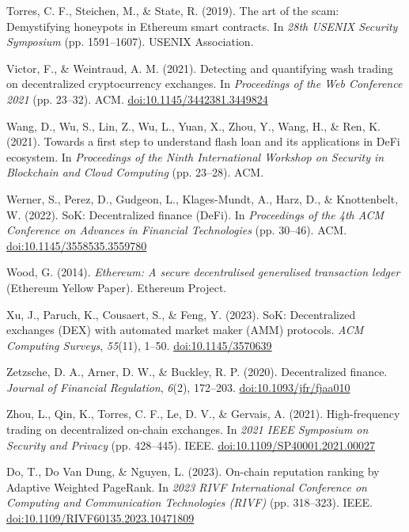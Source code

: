 \begin{enumerate}[label={[\arabic*]}, leftmargin=*, itemsep=0.35em, parsep=0pt]
  \item{}\label{ref:56} Torres, C. F., Steichen, M., \& State, R. (2019). The art of the scam: Demystifying honeypots in Ethereum smart contracts. In \textit{28th USENIX Security Symposium} (pp. 1591--1607). USENIX Association.
  \item{}\label{ref:57} Victor, F., \& Weintraud, A. M. (2021). Detecting and quantifying wash trading on decentralized cryptocurrency exchanges. In \textit{Proceedings of the Web Conference 2021} (pp. 23--32). ACM. \href{https://doi.org/10.1145/3442381.3449824}{doi:10.1145/3442381.3449824}
  \item{}\label{ref:58} Wang, D., Wu, S., Lin, Z., Wu, L., Yuan, X., Zhou, Y., Wang, H., \& Ren, K. (2021). Towards a first step to understand flash loan and its applications in DeFi ecosystem. In \textit{Proceedings of the Ninth International Workshop on Security in Blockchain and Cloud Computing} (pp. 23--28). ACM.
  \item{}\label{ref:59} Werner, S., Perez, D., Gudgeon, L., Klages-Mundt, A., Harz, D., \& Knottenbelt, W. (2022). SoK: Decentralized finance (DeFi). In \textit{Proceedings of the 4th ACM Conference on Advances in Financial Technologies} (pp. 30--46). ACM. \href{https://doi.org/10.1145/3558535.3559780}{doi:10.1145/3558535.3559780}
  \item{}\label{ref:60} Wood, G. (2014). \textit{Ethereum: A secure decentralised generalised transaction ledger} (Ethereum Yellow Paper). Ethereum Project.
  \item{}\label{ref:61} Xu, J., Paruch, K., Cousaert, S., \& Feng, Y. (2023). SoK: Decentralized exchanges (DEX) with automated market maker (AMM) protocols. \textit{ACM Computing Surveys}, \textit{55}(11), 1--50. \href{https://doi.org/10.1145/3570639}{doi:10.1145/3570639}
  \item{}\label{ref:62} Zetzsche, D. A., Arner, D. W., \& Buckley, R. P. (2020). Decentralized finance. \textit{Journal of Financial Regulation}, \textit{6}(2), 172--203. \href{https://doi.org/10.1093/jfr/fjaa010}{doi:10.1093/jfr/fjaa010}
  \item{}\label{ref:63} Zhou, L., Qin, K., Torres, C. F., Le, D. V., \& Gervais, A. (2021). High-frequency trading on decentralized on-chain exchanges. In \textit{2021 IEEE Symposium on Security and Privacy} (pp. 428--445). IEEE. \href{https://doi.org/10.1109/SP40001.2021.00027}{doi:10.1109/SP40001.2021.00027}
  \item{}\label{ref:64} Do, T., Do Van Dung, \& Nguyen, L. (2023). On-chain reputation ranking by Adaptive Weighted PageRank. In \textit{2023 RIVF International Conference on Computing and Communication Technologies (RIVF)} (pp. 318--323). IEEE. \href{https://doi.org/10.1109/RIVF60135.2023.10471809}{doi:10.1109/RIVF60135.2023.10471809}
\end{enumerate}

